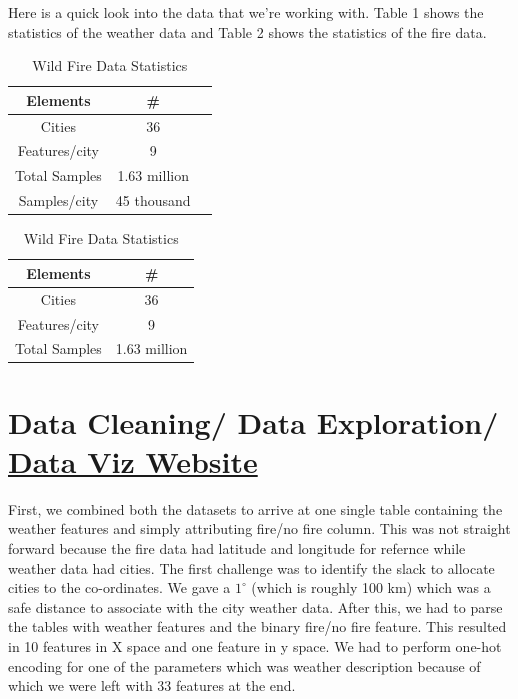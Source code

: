 \documentclass{article}
\begin{document}
Here is a quick look into the data that we're working with. Table 1 shows the
statistics of the weather data and Table 2 shows the statistics of the fire
data.\par

\begin{table}[H]
    \centering
    \begin{minipage}[t]{0.45\textwidth}
        \caption{Weather Data Statistics}
        \begin{tabular}{c c c}
            \hline
            Elements & \# \\ %
            \hline
                Cities & 36 \\
                Features/city & 9 \\
                Total Samples & 1.63 million \\
                Samples/city & 45 thousand 
                
        \end{tabular}
    \end{minipage}
    \begin{minipage}[t]{0.45\textwidth}
        \caption{Wild Fire Data Statistics}
        \begin{tabular}{c c}
            \hline
            Elements & \# \\ %
            \hline
            Cities & 36 \\
            Features/city & 9 \\
            Total Samples & 1.63 million\\
        \end{tabular}
    \end{minipage}
\end{table}
\section{Data Cleaning/ Data Exploration/
\href{https://leafyao8621.github.io/firevisualization.github.io/}
{Data Viz Website}}
First, we combined both the datasets to arrive at one single table containing
the weather features and simply attributing fire/no fire column. This was not
straight forward because the fire data had latitude and longitude for refernce
while weather data had cities. The first challenge was to identify the slack to
allocate cities to the co-ordinates. We gave a $1^\circ$ (which is roughly
100 km) which was a safe distance to associate with the city weather data.
After this, we had to parse the tables with weather features and the binary
fire/no fire feature. This resulted in 10 features in X space and one feature
in y space. We had to perform one-hot encoding for one of the parameters which
was weather description because of which we were left with 33 features at the
end.\par
\end{document}
